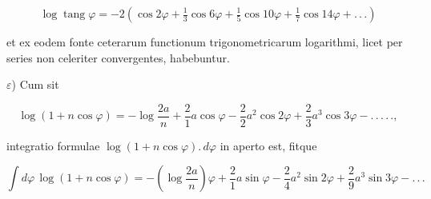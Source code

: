 \[
\log\operatorname{tang}\varphi = -2\left(\cos2\varphi + \tfrac{1}{3}\cos6\varphi + \tfrac{1}{5}\cos10\varphi + \tfrac{1}{7}\cos14\varphi + .\,.\,.\right)
\]

\noindent et ex eodem fonte ceterarum functionum trigonometricarum logarithmi, licet per series
non celeriter convergentes, habebuntur.

$\varepsilon$) Cum sit

\[
\log(1+n\cos\varphi) = -\log\frac{2a}{n} + \frac{2}{1}a\cos\varphi - \frac{2}{2}a^2\cos2\varphi + \frac{2}{3}a^3\cos3\varphi - .\,.\,.\,.\,.,
\]

\noindent integratio formulae $\log(1+n\cos\varphi).\,d\varphi$ in aperto est, fitque

\[
\int d\varphi\,\log(1+n\cos\varphi) = -\left(\log\frac{2a}{n}\right)\varphi + \frac{2}{1}a\sin\varphi - \frac{2}{4}a^2\sin2\varphi + \frac{2}{9}a^3\sin3\varphi - .\,.\,. 
\]

